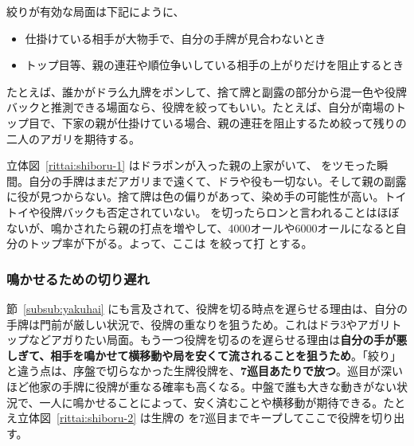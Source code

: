 \documentclass[../nankiru_main.tex]{subfiles}
\begin{document}
絞りが有効な局面は下記にように、

\begin{itemize}
\item 仕掛けている相手が大物手で、自分の手牌が見合わないとき
\item トップ目等、親の連荘や順位争いしている相手の上がりだけを阻止するとき
\end{itemize}

たとえば、誰かがドラ么九牌をポンして、捨て牌と副露の部分から混一色や役牌バックと推測できる場面なら、役牌を絞ってもいい。たとえば、自分が南場のトップ目で、下家の親が仕掛けている場合、親の連荘を阻止するため絞って残りの二人のアガリを期待する。

立体図~\ref{rittai:shiboru-1} はドラポンが入った親の上家がいて、 をツモった瞬間。自分の手牌はまだアガリまで遠くて、ドラや役も一切ない。そして親の副露に役が見つからない。捨て牌は色の偏りがあって、染め手の可能性が高い。トイトイや役牌バックも否定されていない。 を切ったらロンと言われることはほぼないが、鳴かされたら親の打点を増やして、4000オールや6000オールになると自分のトップ率が下がる。よって、ここは  を絞って打  とする。

\begin{rittai}[h]
  \centering  {}
  \caption{見合わない手なら、鳴かれる可能性が高い大物手の相手や親に役牌を軽易に切るべきではない。}
  \label{rittai:shiboru-1}
\end{rittai}


\subsubsection*{鳴かせるための切り遅れ}

節~\ref{subsub:yakuhai} にも言及されて、役牌を切る時点を遅らせる理由は、自分の手牌は門前が厳しい状況で、役牌の重なりを狙うため。これはドラ3やアガリトップなどアガりたい局面。もう一つ役牌を切るのを遅らせる理由は\textbf{自分の手が悪しぎて、相手を鳴かせて横移動や局を安くて流されることを狙うため}\citep{mark2-shibori}。「絞り」と違う点は、序盤で切らなかった生牌役牌を、\textbf{7巡目あたりで放つ}。巡目が深いほど他家の手牌に役牌が重なる確率も高くなる。中盤で誰も大きな動きがない状況で、一人に鳴かせることによって、安く済むことや横移動が期待できる。たとえ立体図~\ref{rittai:shiboru-2} は生牌の  を7巡目までキープしてここで役牌を切り出す。
\end{document}
